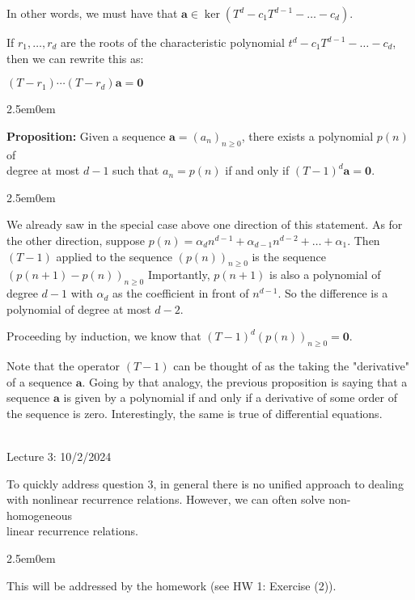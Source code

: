\documentclass{book}
\newcommand{\hTwo}{%
\color{MidnightBlue}%
   \fontsize{13}{15}\selectfont%
}
\newcommand{\hThree}{%
   \color{PineGreen!85!Orange}
   \fontsize{12}{14}\selectfont%
}
\newcommand{\exOne}{%
   \color{Purple}%
   \fontsize{13}{15}\selectfont%
}
\newenvironment{myIndent}{%
   \begin{adjustwidth}{2.5em}{0em}%
}{%
   \end{adjustwidth}%
}
\newcommand{\blab}[1]{\textbf{#1}}
\newcommand{\mySepTwo}[1][.]{%
   {\noindent\color{#1}{\rule{6.5in}{0.5mm}}}\\%
}
\newcommand{\retTwo}{\hfill\bigbreak}
\newcommand{\mHeader}[1]{{
   \color{Black}%
   \fontsize{20}{18}\selectfont%
   #1\retTwo
}}
\begin{document}
In other words, we must have that $\bm{a} \in \ker(T^d - c_1T^{d-1} - \ldots - c_d)$.\retTwo

If $r_1, \ldots, r_d$ are the roots of the characteristic polynomial $t^d - c_1T^{d-1} - \ldots - c_d$, then we can rewrite this as:

{\centering $(T - r_1)\cdots(T - r_d)\bm{a} = \bm{0}$ \retTwo\par}

\begin{myIndent}\hTwo
   \blab{Proposition:} Given a sequence $\bm{a} = (a_n)_{n \geq 0}$, there exists a polynomial $p(n)$ of\\ degree at most $d - 1$ such that $a_n = p(n)$ if and only if $(T - 1)^d\bm{a} = \bm{0}$.

   \begin{myIndent}\hThree
      We already saw in the special case above one direction of this statement. As for the other direction, suppose $p(n) = \alpha_d n^{d-1} + \alpha_{d-1}n^{d-2} + \ldots + \alpha_1$. Then $(T - 1)$ applied to the sequence $(p(n))_{n\geq 0}$ is the sequence $(p(n + 1) - p(n))_{n \geq 0}$ Importantly, $p(n + 1)$ is also a polynomial of degree $d - 1$ with $\alpha_d$ as the coefficient in front of $n^{d - 1}$. So the difference is a polynomial of degree at most $d - 2$.\newpage

      Proceeding by induction, we know that $(T - 1)^d(p(n))_{n\geq 0} = \bm{0}$.\retTwo
   \end{myIndent}   
\end{myIndent}

Note that the operator $(T - 1)$ can be thought of as the taking the "derivative" of a sequence $\bm{a}$. Going by that analogy, the previous proposition is saying that a sequence $\bm{a}$ is given by a polynomial if and only if a derivative of some order of the sequence is zero. Interestingly, the same is true of differential equations.\retTwo

\mySepTwo

\mHeader{Lecture 3: 10/2/2024}

To quickly address question 3, in general there is no unified approach to dealing with nonlinear recurrence relations. However, we can often solve non-homogeneous\\ linear recurrence relations.
\begin{myIndent}\exOne
   This will be addressed by the homework (see HW 1: Exercise (2)).\retTwo
\end{myIndent}
\end{document}
